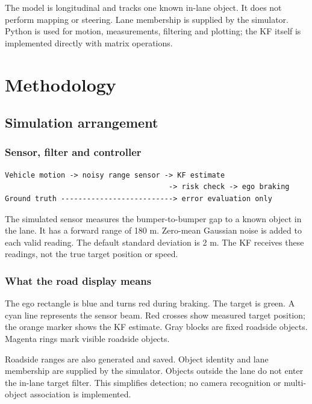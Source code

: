\documentclass[11pt,a4paper]{article}
\begin{document}
The model is longitudinal and tracks one known in-lane object. It does not perform mapping or steering. Lane membership is supplied by the simulator. Python is used for motion, measurements, filtering and plotting; the KF itself is implemented directly with matrix operations.\par

\clearpage\section{Methodology}
\subsection{Simulation arrangement}
\subsubsection{Sensor, filter and controller}
\begin{lstlisting}
Vehicle motion -> noisy range sensor -> KF estimate
                                      -> risk check -> ego braking
Ground truth --------------------------> error evaluation only
\end{lstlisting}
The simulated sensor measures the bumper-to-bumper gap to a known object in the lane. It has a forward range of 180 m. Zero-mean Gaussian noise is added to each valid reading. The default standard deviation is 2 m. The KF receives these readings, not the true target position or speed.\par

\subsubsection{What the road display means}
The ego rectangle is blue and turns red during braking. The target is green. A cyan line represents the sensor beam. Red crosses show measured target position; the orange marker shows the KF estimate. Gray blocks are fixed roadside objects. Magenta rings mark visible roadside objects.\par

Roadside ranges are also generated and saved. Object identity and lane membership are supplied by the simulator. Objects outside the lane do not enter the in-lane target filter. This simplifies detection; no camera recognition or multi-object association is implemented.\par
\end{document}
